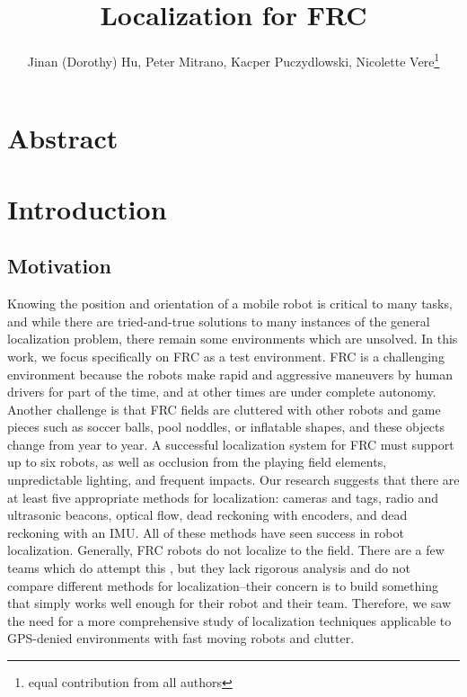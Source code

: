 \documentclass{article}
\begin{document}
\title{Localization for FRC}
\author{Jinan (Dorothy) Hu, Peter Mitrano, Kacper Puczydlowski, Nicolette Vere\thanks{equal contribution from all authors}}

\maketitle{}




\section*{Abstract}





\section{Introduction}




\subsection{Motivation}

  Knowing the position and orientation of a mobile robot is critical to many tasks, and while there are tried-and-true solutions to many instances of the general localization problem, there remain some environments which are unsolved. In this work, we focus specifically on FRC as a test environment. FRC is a challenging environment because the robots make rapid and aggressive maneuvers by human drivers for part of the time, and at other times are under complete autonomy. Another challenge is that FRC fields are cluttered with other robots and game pieces such as soccer balls, pool noddles, or inflatable shapes, and these objects change from year to year. A successful localization system for FRC must support up to six robots, as well as occlusion from the playing field elements, unpredictable lighting, and frequent impacts. Our research suggests that there are at least five appropriate methods for localization: cameras and tags, radio and ultrasonic beacons, optical flow, dead reckoning with encoders, and dead reckoning with an IMU. All of these methods have seen success in robot localization. Generally, FRC robots do not localize to the field. There are a few teams which do attempt this \cite{balaji_zebravision_2017}, but they lack rigorous analysis and do not compare different methods for localization--their concern is to build something that simply works well enough for their robot and their team. Therefore, we saw the need for a more comprehensive study of localization techniques applicable to GPS-denied environments with fast moving robots and clutter.
\end{document}
